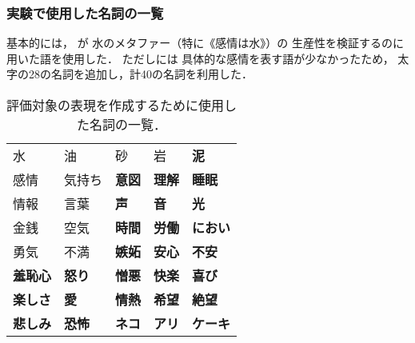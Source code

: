 \documentclass[12pt,usepdftitle=false]{beamer}
\begin{document}
\begin{frame}
    \frametitle{実験で使用した名詞の一覧}
    基本的には，
    \citet{nabeshima2011}が
    水のメタファー（特に《感情は水》）の
    生産性を検証するのに用いた語を使用した．
    ただし\citet{nabeshima2011}には
    具体的な感情を表す語が少なかったため，
    太字の28の名詞を追加し，計40の名詞を利用した．

    \begin{table}
        \footnotesize
        \begin{tabular}{lllll}
            \toprule
            水 & 油 & 砂 & 岩 & \textbf{泥} \\
            感情 & 気持ち & \textbf{意図} & \textbf{理解} & \textbf{睡眠} \\
            情報 & 言葉 & \textbf{声} & \textbf{音} & \textbf{光} \\
            金銭 & 空気 & \textbf{時間} & \textbf{労働} & \textbf{におい} \\
            勇気 & 不満 & \textbf{嫉妬} & \textbf{安心} & \textbf{不安} \\
            \textbf{羞恥心}  & \textbf{怒り} & \textbf{憎悪} & \textbf{快楽} & \textbf{喜び} \\
            \textbf{楽しさ} & \textbf{愛} & \textbf{情熱} & \textbf{希望} & \textbf{絶望} \\
            \textbf{悲しみ} & \textbf{恐怖} & \textbf{ネコ} & \textbf{アリ} & \textbf{ケーキ} \\
            \bottomrule
        \end{tabular}
        \caption{評価対象の表現を作成するために使用した名詞の一覧．}
    \end{table}
\end{frame}
\end{document}
